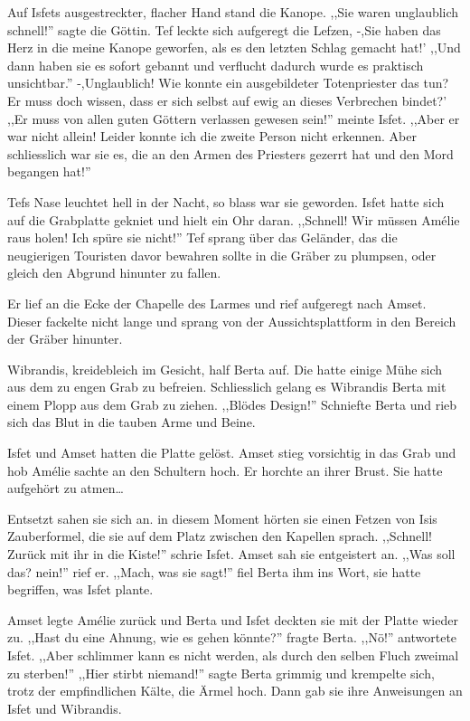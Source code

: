 \documentclass[11pt,titlepage,a5paper]{book}
\begin{document}
Auf Isfets ausgestreckter, flacher Hand stand die Kanope. ,,Sie waren unglaublich schnell!'' sagte die Göttin. Tef leckte sich aufgeregt die Lefzen, -,Sie haben das Herz in die meine Kanope geworfen, als es den letzten Schlag gemacht hat!' ,,Und dann haben sie es sofort gebannt und verflucht dadurch wurde es praktisch unsichtbar.'' -,Unglaublich! Wie konnte ein ausgebildeter Totenpriester das tun? Er muss doch wissen, dass er sich selbst auf ewig an dieses Verbrechen bindet?' ,,Er muss von allen guten Göttern verlassen gewesen sein!'' meinte Isfet. ,,Aber er war nicht allein! Leider konnte ich die zweite Person nicht erkennen. Aber schliesslich war sie es, die an den Armen des Priesters gezerrt hat und den Mord begangen hat!''

Tefs Nase leuchtet hell in der Nacht, so blass war sie geworden. Isfet hatte sich auf die Grabplatte gekniet und hielt ein Ohr daran. ,,Schnell! Wir müssen Amélie raus holen! Ich spüre sie nicht!'' Tef sprang über das Geländer, das die neugierigen Touristen davor bewahren sollte in die Gräber zu plumpsen, oder gleich den Abgrund hinunter zu fallen.

Er lief an die Ecke der Chapelle des Larmes und rief aufgeregt nach Amset. Dieser fackelte nicht lange und sprang von der Aussichtsplattform in den Bereich der Gräber hinunter. 

Wibrandis, kreidebleich im Gesicht, half Berta auf. Die hatte einige Mühe sich aus dem zu engen Grab zu befreien. Schliesslich gelang es Wibrandis Berta mit einem Plopp aus dem Grab zu ziehen. ,,Blödes Design!'' Schniefte Berta und rieb sich das Blut in die tauben Arme und Beine.

Isfet und Amset hatten die Platte gelöst. Amset stieg vorsichtig in das Grab und hob Amélie sachte an den Schultern hoch. Er horchte an ihrer Brust. Sie hatte aufgehört zu atmen\dots

Entsetzt sahen sie sich an. in diesem Moment hörten sie einen Fetzen von Isis Zauberformel, die sie auf dem Platz zwischen den Kapellen sprach. ,,Schnell! Zurück mit ihr in die Kiste!'' schrie Isfet. Amset sah sie entgeistert an. ,,Was soll das? nein!'' rief er. ,,Mach, was sie sagt!'' fiel Berta ihm ins Wort, sie hatte begriffen, was Isfet plante. 

Amset legte Amélie zurück und Berta und Isfet deckten sie mit der Platte wieder zu. ,,Hast du eine Ahnung, wie es gehen könnte?'' fragte Berta. ,,Nö!'' antwortete Isfet. ,,Aber schlimmer kann es nicht werden, als durch den selben Fluch zweimal zu sterben!'' ,,Hier stirbt niemand!'' sagte Berta grimmig und krempelte sich, trotz der empfindlichen Kälte, die Ärmel hoch. Dann gab sie ihre Anweisungen an Isfet und Wibrandis.
\end{document}
